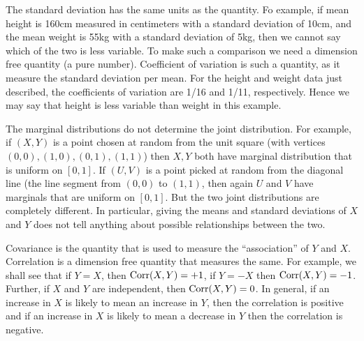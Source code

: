 \documentclass[preprint,  11pt]{amsart}
\begin{document}
The standard deviation has the same units as the quantity. Fo example, if mean height is 160cm  measured in centimeters with a standard deviation of 10cm, and the mean weight is 55kg with a  standard deviation of 5kg, then we cannot say which of the two is less variable. To make such a comparison we need a dimension free quantity (a pure number). Coefficient of variation is such a quantity, as it measure the standard deviation per mean. For the height and weight data just described, the coefficients of variation are 1/16 and 1/11, respectively. Hence we may say that height is less variable than weight in this example.


 The marginal distributions do not determine the joint distribution. For example, if $(X,Y)$ is a point chosen at random from the unit square (with vertices $(0,0),(1,0),(0,1),(1,1)$) then $X,Y$ both have marginal distribution that is uniform on $[0,1]$. If $(U,V)$ is a point picked at random from the diagonal line (the line segment from $(0,0)$ to $(1,1)$, then again $U$ and $V$ have marginals that are uniform on $[0,1]$.
But the two joint distributions are completely different. In particular, giving the means and standard deviations of $X$ and $Y$ does not tell anything about possible relationships between the two.

Covariance is the quantity that is used to measure the ``association'' of $Y$ and $X$. Correlation is a dimension free quantity that measures the same. For example, we shall see that if $Y=X$, then $\mbox{Corr}(X,Y)=+1$, if $Y=-X$ then $\mbox{Corr}(X,Y)=-1$. Further, if $X$ and $Y$ are independent, then $\mbox{Corr}(X,Y)=0$. In general, if an increase in $X$ is likely to mean an increase in $Y$, then the correlation is positive and if an increase in $X$ is likely to mean a decrease in $Y$ then the correlation is negative.
\end{document}
